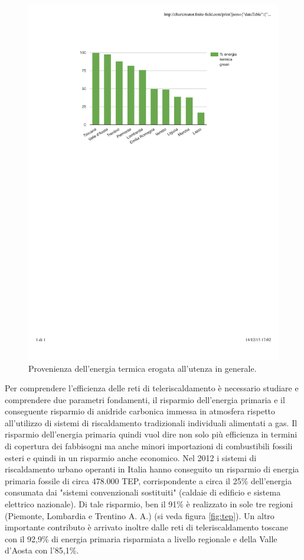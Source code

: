 \documentclass[laurea,oneside,11pt]{USiena_tesiLM}
\begin{document}
\begin{figure}[!ht]
\centering
\includegraphics[width=\textwidth]{figure/energia_green} 
\caption{Provenienza dell'energia termica erogata all'utenza in generale.}
\label{fig:energia_green}
\end{figure}

Per comprendere l'efficienza delle reti di teleriscaldamento è necessario studiare e comprendere due parametri fondamenti, il risparmio dell'energia primaria e il conseguente risparmio di anidride carbonica immessa in atmosfera rispetto all'utilizzo di sistemi di riscaldamento tradizionali individuali alimentati a gas. Il risparmio dell'energia primaria quindi vuol dire non solo più efficienza in termini di copertura dei fabbisogni ma anche minori importazioni di combustibili fossili esteri e quindi in un risparmio anche economico. Nel 2012 i sistemi di riscaldamento urbano operanti in Italia hanno conseguito un risparmio di energia primaria fossile di circa 478.000 TEP, corrispondente a circa il 25\% dell'energia consumata dai "sistemi convenzionali sostituiti" (caldaie di edificio e sistema elettrico nazionale). Di tale risparmio, ben il 91\% è realizzato in sole tre regioni (Piemonte, Lombardia e Trentino A. A.) (si veda figura \ref{fig:tep}). 
Un altro importante contributo è arrivato inoltre dalle reti di teleriscaldamento toscane con il 92,9\% di energia primaria risparmiata a livello regionale e della Valle d'Aosta con l'85,1\%.
\end{document}

